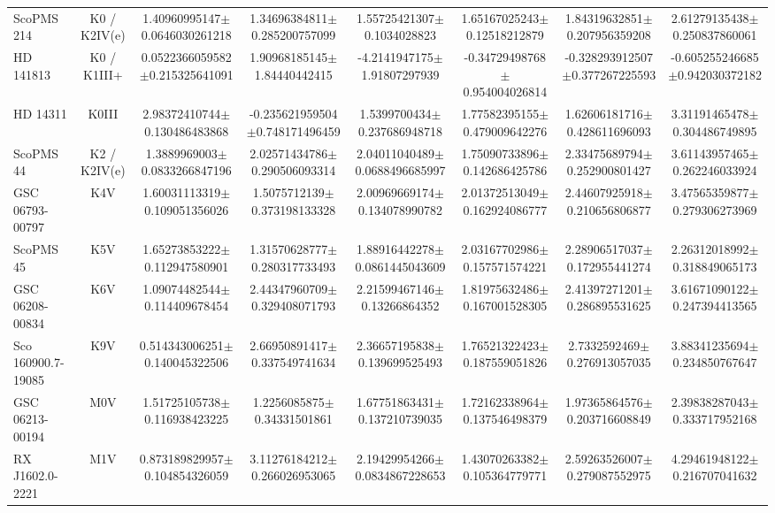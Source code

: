 \begin{table}
\begin{center}
\begin{tabular}{l|c|c|c|c|c|c|c}
ScoPMS 214 & K0 / K2IV(e) & 1.40960995147$\pm$0.0646030261218 & 1.34696384811$\pm$0.285200757099 & 1.55725421307$\pm$0.1034028823 & 1.65167025243$\pm$0.12518212879 & 1.84319632851$\pm$0.207956359208 & 2.61279135438$\pm$0.250837860061 \\
HD 141813 & K0 / K1III+ & 0.0522366059582$\pm$0.215325641091 & 1.90968185145$\pm$1.84440442415 & -4.2141947175$\pm$1.91807297939 & -0.34729498768$\pm$0.954004026814 & -0.328293912507$\pm$0.377267225593 & -0.605255246685$\pm$0.942030372182 \\
HD 14311 & K0III & 2.98372410744$\pm$0.130486483868 & -0.235621959504$\pm$0.748171496459 & 1.5399700434$\pm$0.237686948718 & 1.77582395155$\pm$0.479009642276 & 1.62606181716$\pm$0.428611696093 & 3.31191465478$\pm$0.304486749895 \\
ScoPMS 44 & K2 / K2IV(e) & 1.3889969003$\pm$0.0833266847196 & 2.02571434786$\pm$0.290506093314 & 2.04011040489$\pm$0.0688496685997 & 1.75090733896$\pm$0.142686425786 & 2.33475689794$\pm$0.252900801427 & 3.61143957465$\pm$0.262246033924 \\
GSC 06793-00797 & K4V & 1.60031113319$\pm$0.109051356026 & 1.5075712139$\pm$0.373198133328 & 2.00969669174$\pm$0.134078990782 & 2.01372513049$\pm$0.162924086777 & 2.44607925918$\pm$0.210656806877 & 3.47565359877$\pm$0.279306273969 \\
ScoPMS 45 & K5V & 1.65273853222$\pm$0.112947580901 & 1.31570628777$\pm$0.280317733493 & 1.88916442278$\pm$0.0861445043609 & 2.03167702986$\pm$0.157571574221 & 2.28906517037$\pm$0.172955441274 & 2.26312018992$\pm$0.318849065173 \\
GSC 06208-00834 & K6V & 1.09074482544$\pm$0.114409678454 & 2.44347960709$\pm$0.329408071793 & 2.21599467146$\pm$0.13266864352 & 1.81975632486$\pm$0.167001528305 & 2.41397271201$\pm$0.286895531625 & 3.61671090122$\pm$0.247394413565 \\
Sco 160900.7-19085 & K9V & 0.514343006251$\pm$0.140045322506 & 2.66950891417$\pm$0.337549741634 & 2.36657195838$\pm$0.139699525493 & 1.76521322423$\pm$0.187559051826 & 2.7332592469$\pm$0.276913057035 & 3.88341235694$\pm$0.234850767647 \\
GSC 06213-00194 & M0V & 1.51725105738$\pm$0.116938423225 & 1.2256085875$\pm$0.34331501861 & 1.67751863431$\pm$0.137210739035 & 1.72162338964$\pm$0.137546498379 & 1.97365864576$\pm$0.203716608849 & 2.39838287043$\pm$0.333717952168 \\
RX J1602.0-2221 & M1V & 0.873189829957$\pm$0.104854326059 & 3.11276184212$\pm$0.266026953065 & 2.19429954266$\pm$0.0834867228653 & 1.43070263382$\pm$0.105364779771 & 2.59263526007$\pm$0.279087552975 & 4.29461948122$\pm$0.216707041632 \\

\end{tabular}
\end{center}
\end{table}
